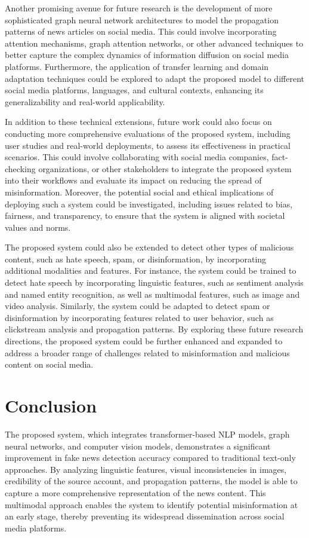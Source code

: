 \documentclass[conference]{IEEEtran}
\begin{document}
Another promising avenue for future research is the development of more sophisticated graph neural network architectures to model the propagation patterns of news articles on social media. This could involve incorporating attention mechanisms, graph attention networks, or other advanced techniques to better capture the complex dynamics of information diffusion on social media platforms. Furthermore, the application of transfer learning and domain adaptation techniques could be explored to adapt the proposed model to different social media platforms, languages, and cultural contexts, enhancing its generalizability and real-world applicability.

In addition to these technical extensions, future work could also focus on conducting more comprehensive evaluations of the proposed system, including user studies and real-world deployments, to assess its effectiveness in practical scenarios. This could involve collaborating with social media companies, fact-checking organizations, or other stakeholders to integrate the proposed system into their workflows and evaluate its impact on reducing the spread of misinformation. Moreover, the potential social and ethical implications of deploying such a system could be investigated, including issues related to bias, fairness, and transparency, to ensure that the system is aligned with societal values and norms.

The proposed system could also be extended to detect other types of malicious content, such as hate speech, spam, or disinformation, by incorporating additional modalities and features. For instance, the system could be trained to detect hate speech by incorporating linguistic features, such as sentiment analysis and named entity recognition, as well as multimodal features, such as image and video analysis. Similarly, the system could be adapted to detect spam or disinformation by incorporating features related to user behavior, such as clickstream analysis and propagation patterns. By exploring these future research directions, the proposed system could be further enhanced and expanded to address a broader range of challenges related to misinformation and malicious content on social media.

\section{Conclusion}
The proposed system, which integrates transformer-based NLP models, graph neural networks, and computer vision models, demonstrates a significant improvement in fake news detection accuracy compared to traditional text-only approaches. By analyzing linguistic features, visual inconsistencies in images, credibility of the source account, and propagation patterns, the model is able to capture a more comprehensive representation of the news content. This multimodal approach enables the system to identify potential misinformation at an early stage, thereby preventing its widespread dissemination across social media platforms.
\end{document}
